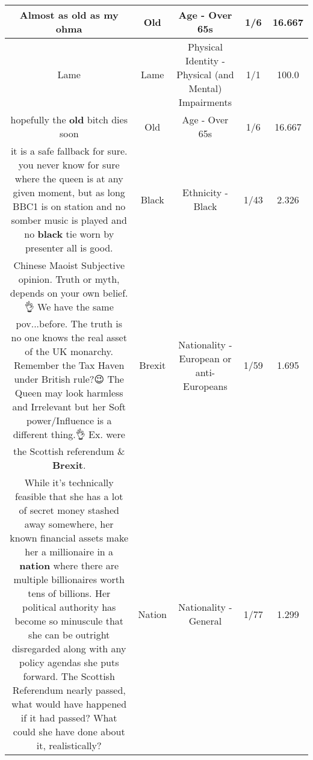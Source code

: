 \documentclass[11pt]{article}
\newlength\mylength
\begin{document}
\begin{center}
\begin{longtable}{|C{.65\mylength}|C{.30\mylength}|C{.12\mylength}|C{.12\mylength}|C{.12\mylength}|}
  \small Almost as \textbf{old} as my ohma\normalsize   & Old & Age - Over 65s & 1/6 & 16.667 \\  \hline
  \small Lame\normalsize   & Lame & Physical Identity - Physical (and Mental) Impairments & 1/1 & 100.0 \\  \hline
  \small hopefully the \textbf{old} bitch dies soon\normalsize   & Old & Age - Over 65s & 1/6 & 16.667 \\  \hline
  \small it is a safe fallback for sure.  you never know for sure where the queen is at any given moment, but as long BBC1 is on station and no somber music is played and no \textbf{black} tie worn by presenter all is good.\normalsize   & Black & Ethnicity - Black & 1/43 & 2.326 \\  \hline
  \small Chinese Maoist Subjective opinion. Truth or myth, depends on your own belief.👌 We have the same pov...before. The truth is no one knows the real asset of the UK monarchy. Remember the Tax Haven under British rule?😉 The Queen may look harmless and Irrelevant but her Soft power/Influence is a different thing.👌 Ex. were the Scottish referendum \& \textbf{Brexit}.\normalsize   & Brexit & Nationality - European or anti-Europeans & 1/59 & 1.695 \\  \hline
  \small While it's technically feasible that she has a lot of secret money stashed away somewhere, her known financial assets make her a millionaire in a \textbf{nation} where there are multiple billionaires worth tens of billions. Her political authority has become so minuscule that she can be outright disregarded along with any policy agendas she puts forward. The Scottish Referendum nearly passed, what would have happened if it had passed? What could she have done about it, realistically?\normalsize   & Nation & Nationality - General & 1/77 & 1.299 \\  \hline

\end{longtable}
\end{center}
\end{document}
